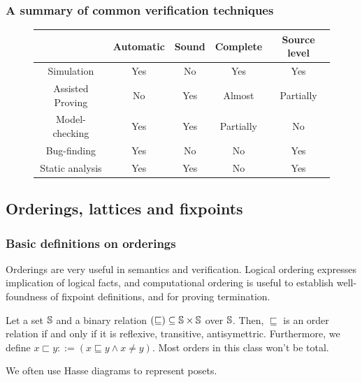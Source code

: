 \documentclass[toc]{../cs-classes/cs-classes}
\begin{document}
\subsubsection{A summary of common verification techniques}
\begin{figure}[!ht]
    \centering
    \begin{tabular}{|c||c|c|c|c|}
        \hline
        &Automatic&Sound&Complete&Source level\\
        \hline
        \hline
        Simulation&Yes&No&Yes&Yes\\
        \hline
        Assisted Proving&No&Yes&Almost&Partially\\
        \hline
        Model-checking&Yes&Yes&Partially&No\\
        \hline
        Bug-finding&Yes&No&No&Yes\\
        \hline
        Static analysis&Yes&Yes&No&Yes\\
        \hline
    \end{tabular}
\end{figure}

\subsection{Orderings, lattices and fixpoints}
\subsubsection{Basic definitions on orderings}
Orderings are very useful in semantics and verification. Logical ordering expresses implication of logical facts, and computational ordering is useful to establish well-foundness of fixpoint definitions, and for proving termination.

\begin{definition}
    Let a set $\S$ and a binary relation $(\sqsubseteq)\subseteq\S\times\S$ over $\S$. Then, $\sqsubseteq$ is an order relation if and only if it is reflexive, transitive, antisymettric. Furthermore, we define $x\sqsubset y::=(x\sqsubseteq y \land x\neq y)$. Most orders in this class won't be total.
\end{definition}

We often use Hasse diagrams to represent posets.
\end{document}
